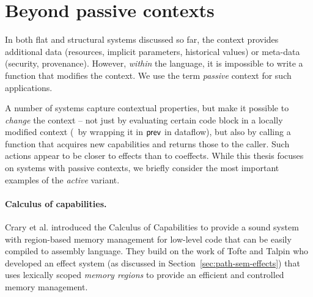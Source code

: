 
\section{Beyond passive contexts}

In both flat and structural systems discussed so far, the context provides additional data (resources,
implicit parameters, historical values) or meta-data (security, provenance). However, \emph{within}
the language, it is impossible to write a function that modifies the context. We use the term
\emph{passive} context for such applications.

A number of systems capture contextual properties, but make it possible to
\emph{change} the context -- not just by evaluating certain code block in a locally modified context
(\eg~by wrapping it in $\textnormal{\sffamily prev}$ in dataflow), but also by calling a function that
acquires new capabilities and returns those to the caller. Such actions appear to be closer to
effects than to coeffects. While this thesis focuses on systems with passive contexts, we briefly
consider the most important examples of the \emph{active} variant.


\paragraph{Calculus of capabilities.}
\label{sec:applications-active-ccc}

Crary et al. \cite{app-capabilities} introduced the Calculus of Capabilities to provide
a sound system with region-based memory management for low-level code that can be easily
compiled to assembly language. They build on the work of Tofte and Talpin \cite{app-region-memory}
who developed an effect system (as discussed in Section~\ref{sec:path-sem-effects}) that uses
lexically scoped \emph{memory regions} to provide an efficient and controlled memory management.


